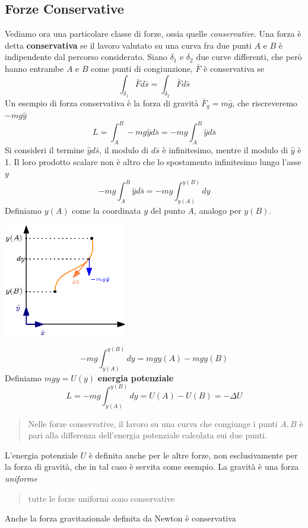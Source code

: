 \documentclass[10pt, letterpaper]{report}
\begin{document}
\subsection{Forze Conservative}
Vediamo ora una particolare classe di forze, ossia quelle 
\textit{conservative}.\acc 
{} Una forza è detta \textbf{conservativa} se il lavoro 
valutato su una curva fra due punti $A$ e $B$ è indipendente dal 
percorso considerato. Siano $\delta_1$ e $\delta_2$ due curve 
differenti, che però hanno entrambe $A$ e $B$ come punti di 
congiunzione, $\bar F$ è conservativa se 
$$ \int_{\delta_1}\bar Fd\bar s=\int_{\delta_2}\bar Fd\bar s$$
Un esempio di forza conservativa è la forza di gravità
 $\bar F_g=m\bar g$, che riscreveremo $-mg\hat y$
 $$ L=\int_{A}^B -mg\hat y d\bar s = -mg\int_A^B \hat y d \bar s$$
Si consideri il termine $\hat y d\bar s$, il modulo di $d\bar s$ 
è infinitesimo, mentre il modulo di $\hat y$ è 1. Il loro prodotto 
scalare non è altro che lo spostamento infinitesimo lungo l'asse $y$
$$
-mg\int_A^B \hat y d \bar s = -mg\int_{y(A)}^{y(B)}dy
$$
Definiamo $y(A)$ come la coordinata $y$ del punto $A$,
analogo per $y(B)$.\begin{center}
    \includegraphics[width=0.4\textwidth]{images/gravitaConservativa.eps}
\end{center}
$$ -mg\int_{y(A)}^{y(B)}dy=mgy(A)-mgy(B)$$
Definiamo $mgy=U(y)$ \textbf{energia potenziale}
$$ L=-mg\int_{y(A)}^{y(B)}dy=U(A)-U(B)=-\Delta U$$
\begin{quote}
    Nelle forze conservative, il lavoro su una curva che congiunge i punti $A,B$ è pari alla differenza
     dell'energia potenziale calcolata sui due punti.
\end{quote}
L'energia potenziale $U$ è definita anche per le altre forze, non esclusivamente 
per la forza di gravità, che in tal caso è servita come esempio. La gravità 
è una forza \textit{uniforme}\begin{quote}
    tutte le forze uniformi sono conservative
\end{quote}
Anche la forza gravitazionale definita da Newton è conservativa 
\end{document}
